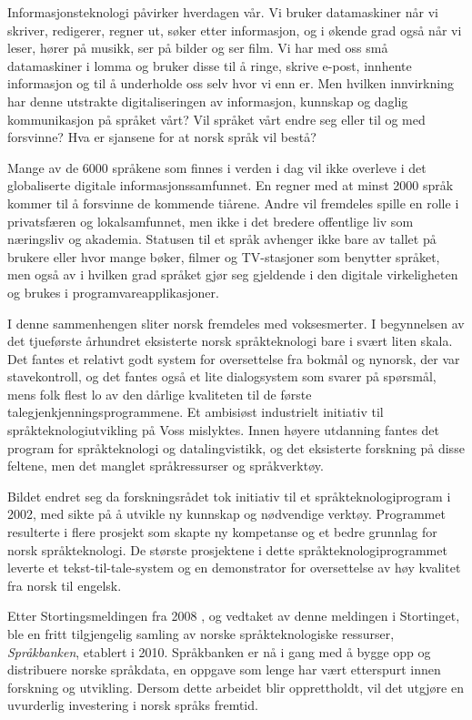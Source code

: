 \begin{multicols}{2}
Informasjonsteknologi påvirker hverdagen vår. Vi bruker datamaskiner når vi skriver, redigerer, regner ut, søker etter informasjon, og i økende grad også når vi leser, hører på musikk, ser på bilder og ser film. Vi har med oss små datamaskiner i lomma og bruker disse til å ringe, skrive e-post, innhente informasjon og til å underholde oss selv hvor vi enn er. Men hvilken innvirkning har denne utstrakte digitaliseringen av informasjon, kunnskap og daglig kommunikasjon på språket vårt? Vil språket vårt endre seg eller til og med forsvinne? Hva er sjansene for at norsk språk vil bestå?        

Mange av de 6000 språkene som finnes i verden i dag vil ikke overleve i det globaliserte digitale informasjonssamfunnet. En regner med at minst 2000 språk kommer til å forsvinne de kommende tiårene.  Andre vil fremdeles spille en rolle i privatsfæren og lokalsamfunnet, men ikke i det bredere offentlige liv som næringsliv og akademia. Statusen til et språk avhenger ikke bare av tallet på brukere eller hvor mange bøker, filmer og TV-stasjoner som benytter språket, men også av i hvilken grad språket gjør seg gjeldende i den digitale virkeligheten og brukes  i programvareapplikasjoner. 

I denne sammenhengen sliter norsk fremdeles med voksesmerter. I begynnelsen av det tjueførste århundret eksisterte norsk språkteknologi bare i svært liten skala. Det fantes et relativt godt system for oversettelse fra bokmål og nynorsk, der var stavekontroll, og det fantes også et lite dialogsystem som svarer på spørsmål, mens folk flest lo av den dårlige kvaliteten til de første talegjenkjenningsprogrammene. Et ambisiøst industrielt initiativ til språkteknologiutvikling på Voss mislyktes. Innen høyere utdanning fantes det program for språkteknologi og datalingvistikk, og det eksisterte forskning på disse feltene, men det manglet språkressurser og språkverktøy.            

Bildet endret seg da forskningsrådet tok initiativ til et språkteknologiprogram i 2002, med sikte på å utvikle ny kunnskap og nødvendige verktøy. Programmet resulterte i flere prosjekt som skapte ny kompetanse og et bedre grunnlag for norsk språkteknologi. De største prosjektene i dette språkteknologiprogrammet leverte et tekst-til-tale-system og en demonstrator for oversettelse av høy kvalitet fra norsk til engelsk.

Etter Stortingsmeldingen fra 2008 \cite{stm35:2008}, og vedtaket av denne meldingen i Stortinget, ble en fritt tilgjengelig samling av norske språkteknologiske ressurser, \emph{Språkbanken}, etablert i 2010. Språkbanken er nå i gang med å bygge opp og distribuere norske språkdata, en oppgave som lenge har vært etterspurt innen forskning og utvikling. Dersom dette arbeidet blir opprettholdt, vil det utgjøre en uvurderlig investering i norsk språks fremtid.     


\end{multicols}
